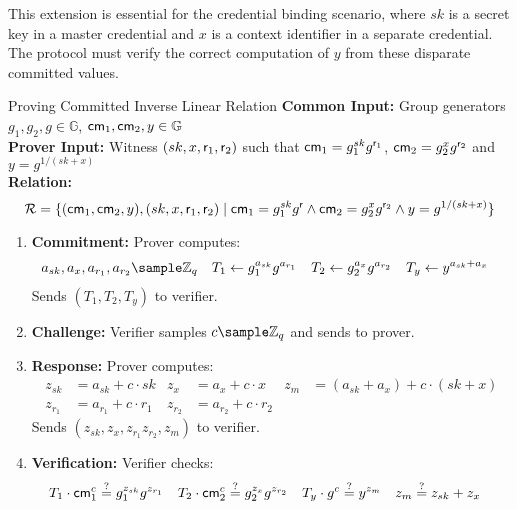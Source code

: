 This extension is essential for the credential binding scenario, where $sk$ is a secret key in a master credential and $x$ is a context identifier in a separate credential. The protocol must verify the correct computation of $y$ from these disparate committed values.

\begin{protocol}{Proving Committed Inverse Linear Relation}{}\label{pok-committed-inverse-linear-relation}
\textbf{Common Input:} Group generators $g_1, g_2, g \in \mathbb{G}$, $\mathsf{cm}_1, \mathsf{cm}_2, y \in \mathbb{G}$ \\
\textbf{Prover Input:} Witness $(sk, x, \mathsf{r}_1, \mathsf{r}_2)$ such that $\mathsf{cm}_1 = g_1^{sk} g^{\mathsf{r}_1}$, $\mathsf{cm}_2 = g_2^{x}g^{\mathsf{r}_2}$ and $ y = g^{1/(sk + x)}$ \\
\textbf{Relation: }
\[
\mathcal{R} = \{(\mathsf{cm}_1,\mathsf{cm}_2, y), (sk, x, \mathsf{r}_1, \mathsf{r}_2) \mid \mathsf{cm}_1 = g_1^{sk} g^{\mathsf{r}} \wedge \mathsf{cm}_2 = g_2^{x}g^{\mathsf{r}_2} \wedge y = g^{1/(sk + x)}\}
\]
\begin{enumerate}
    \item \textbf{Commitment:} Prover computes:
    \begin{align*}
        a_{sk}, a_x, a_{r_1}, a_{r_2} &\sample \Z_q & T_1 &\gets g_1^{a_{sk}} g^{a_{r_1}} & T_2 &\gets g_2^{a_x} g^{a_{r_2}} & T_y &\gets y^{a_{sk} + a_x}
    \end{align*}
    Sends $(T_1, T_2, T_y)$ to verifier.
    
    \item \textbf{Challenge:} Verifier samples $c \sample \mathbb{Z}_q$ and sends to prover.
    
    \item \textbf{Response:} Prover computes:
     \begin{align*}
        z_{sk} &= a_{sk} + c \cdot sk & z_x &= a_x + c \cdot x &  z_m &= (a_{sk} + a_x) + c \cdot (sk + x)\\   
        z_{r_1} &= a_{r_1} + c \cdot r_1 & z_{r_2} &= a_{r_2} + c \cdot r_2
    \end{align*}
    Sends $(z_{sk}, z_x, z_{r_1} z_{r_2}, z_m)$ to verifier.
    
    \item \textbf{Verification:} Verifier checks:
    \begin{align*}
        T_1 \cdot \mathsf{cm}_1^c &\stackrel{?}{=} g_1^{z_{sk}}g^{z_{r_1}} 
        &
        T_2 \cdot \mathsf{cm}_2^c &\stackrel{?}{=}  g_2^{z_x} g^{z_{r_2}} 
        &
        T_y \cdot g^c &\stackrel{?}{=} y^{z_m} &
        z_m &\stackrel{?}{=} z_{sk} + z_x
    \end{align*}
\end{enumerate}
\end{protocol}


